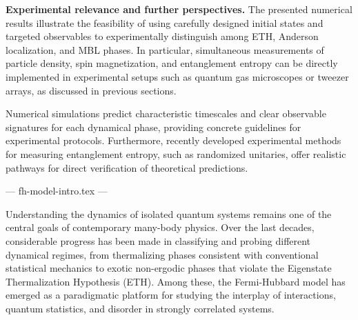 


\textbf{Experimental relevance and further perspectives.}
The presented numerical results illustrate the feasibility of using carefully designed initial states and targeted observables to experimentally distinguish among ETH, Anderson localization, and MBL phases. In particular, simultaneous measurements of particle density, spin magnetization, and entanglement entropy can be directly implemented in experimental setups such as quantum gas microscopes or tweezer arrays, as discussed in previous sections.

Numerical simulations predict characteristic timescales and clear observable signatures for each dynamical phase, providing concrete guidelines for experimental protocols. Furthermore, recently developed experimental methods for measuring entanglement entropy, such as randomized unitaries, offer realistic pathways for direct verification of theoretical predictions.









--- fh-model-intro.tex ---


Understanding the dynamics of isolated quantum systems remains one of the central goals of contemporary many-body physics. Over the last decades, considerable progress has been made in classifying and probing different dynamical regimes, from thermalizing phases consistent with conventional statistical mechanics to exotic non-ergodic phases that violate the Eigenstate Thermalization Hypothesis (ETH). Among these, the Fermi-Hubbard model has emerged as a paradigmatic platform for studying the interplay of interactions, quantum statistics, and disorder in strongly correlated systems.

